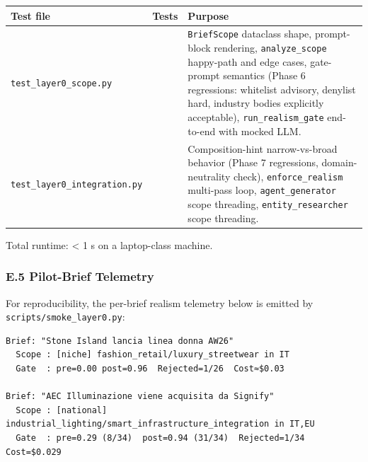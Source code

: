 \documentclass[
]{article}
\begin{document}
\begin{longtable}[]{@{}
  >{\raggedright\arraybackslash}p{}
  >{\raggedright\arraybackslash}p{}
  >{\raggedright\arraybackslash}p{}@{}}
\toprule\noalign{}
\begin{minipage}[b]{\linewidth}\raggedright
Test file
\end{minipage} & \begin{minipage}[b]{\linewidth}\raggedright
Tests
\end{minipage} & \begin{minipage}[b]{\linewidth}\raggedright
Purpose
\end{minipage} \\
\midrule\noalign{}
\endhead
\bottomrule\noalign{}
\endlastfoot
\texttt{test\_layer0\_scope.py} & 19 & \texttt{BriefScope} dataclass
shape, prompt-block rendering, \texttt{analyze\_scope} happy-path and
edge cases, gate-prompt semantics (Phase 6 regressions: whitelist
advisory, denylist hard, industry bodies explicitly acceptable),
\texttt{run\_realism\_gate} end-to-end with mocked LLM. \\
\texttt{test\_layer0\_integration.py} & 19 & Composition-hint
narrow-vs-broad behavior (Phase 7 regressions, domain-neutrality check),
\texttt{enforce\_realism} multi-pass loop, \texttt{agent\_generator}
scope threading, \texttt{entity\_researcher} scope threading. \\
\end{longtable}

Total runtime: \textless{} 1 s on a laptop-class machine.

\subsubsection{E.5 Pilot-Brief
Telemetry}\label{e.5-pilot-brief-telemetry}

For reproducibility, the per-brief realism telemetry below is emitted by
\texttt{scripts/smoke\_layer0.py}:

\begin{verbatim}
Brief: "Stone Island lancia linea donna AW26"
  Scope : [niche] fashion_retail/luxury_streetwear in IT
  Gate  : pre=0.00 post=0.96  Rejected=1/26  Cost≈$0.03

Brief: "AEC Illuminazione viene acquisita da Signify"
  Scope : [national] industrial_lighting/smart_infrastructure_integration in IT,EU
  Gate  : pre=0.29 (8/34)  post=0.94 (31/34)  Rejected=1/34  Cost=$0.029
\end{verbatim}
\end{document}
